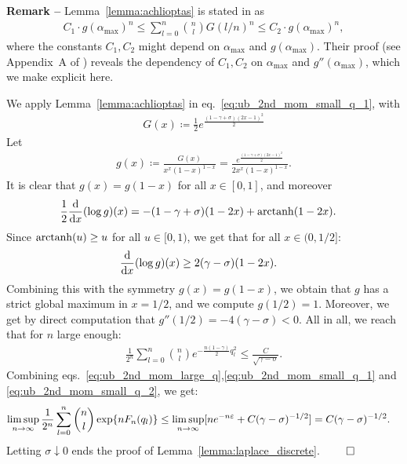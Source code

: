 \noindent 
\textbf{Remark --} Lemma~\ref{lemma:achlioptas} is stated in \cite{achlioptas2002asymptotic}
as 
\begin{align*}
    C_1 \cdot g(\alpha_{\max})^n \leq \sum_{l=0}^n \binom{n}{l} G(l/n)^n\leq C_2 \cdot g(\alpha_{\max})^{n},
\end{align*}
where the constants $C_1, C_2$ might depend on $\alpha_{\max}$ and $g(\alpha_{\max})$. 
Their proof (see Appendix~A of \cite{achlioptas2002asymptotic}) reveals the dependency of $C_1, C_2$ on $\alpha_{\max}$ and $g''(\alpha_{\max})$, which we make explicit here.

\myskip
We apply Lemma~\ref{lemma:achlioptas} in eq.~\eqref{eq:ub_2nd_mom_small_q_1}, with 
\begin{align*}
    G(x) \coloneqq \frac{1}{2} e^{\frac{(1-\gamma+\sigma) (2 x - 1)^2}{2}}
\end{align*}
Let
\begin{align*}
    g(x) \coloneqq \frac{G(x)}{x^x (1-x)^{1-x}} = \frac{e^{\frac{(1-\gamma+\sigma) (2 x - 1)^2}{2}}}{2 x^x (1-x)^{1-x}}.
\end{align*}
It is clear that $g(x) = g(1-x)$ for all $x \in [0,1]$, and moreover
\begin{align*}
    \frac{1}{2}\frac{\mathrm{d}}{\mathrm{d} x} (\log g)(x) &= - (1-\gamma+\sigma)(1-2x) + \operatorname{arctanh}(1-2x).
\end{align*}
Since $\operatorname{arctanh}(u) \geq u$ for all $u \in [0,1)$, we get that for all $x \in (0,1/2]$:
\begin{align*}
    \frac{\mathrm{d}}{\mathrm{d} x} (\log g)(x) &\geq 2(\gamma-\sigma) (1-2x).
\end{align*}
Combining this with the symmetry $g(x) = g(1-x)$, we obtain that $g$
has a strict global maximum in $x = 1/2$, and we compute $g(1/2) = 1$.
Moreover, we get by direct computation that $g''(1/2) = - 4(\gamma-\sigma)  < 0$.
All in all, we reach that for $n$ large enough:
\begin{align}
    \label{eq:ub_2nd_mom_small_q_2}
     \frac{1}{2^n} \sum_{l=0}^n \binom{n}{l} e^{-\frac{n(1-\gamma)}{2} q_l^2} \leq \frac{C}{\sqrt{\gamma-\sigma}}.
\end{align}
Combining eqs.~\eqref{eq:ub_2nd_mom_large_q},\eqref{eq:ub_2nd_mom_small_q_1} and \eqref{eq:ub_2nd_mom_small_q_2}, we get:
\begin{align*}
    \limsup_{n \to \infty} \frac{1}{2^n}\sum_{l=0}^n \binom{n}{l} \exp\{n F_n(q_l)\} &\leq \limsup_{n \to \infty} [n e^{-n \varepsilon} + C (\gamma-\sigma)^{-1/2}] = C (\gamma-\sigma)^{-1/2}.
\end{align*}
Letting $\sigma \downarrow 0$ ends the proof of Lemma~\ref{lemma:laplace_discrete}. $\qed$


